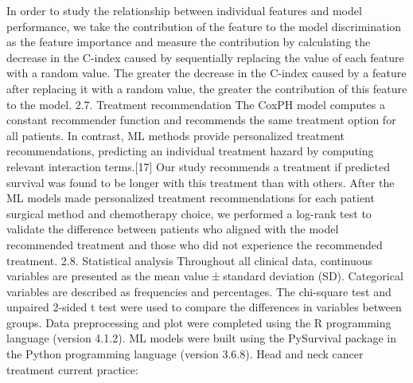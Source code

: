 \documentclass{article}%
\begin{document}
\newline%
\newline%
%
In order to study the relationship between individual features and model performance, we take the contribution of the feature to the model discrimination as the feature importance and measure the contribution by calculating the decrease in the C{-}index caused by sequentially replacing the value of each feature with a random value. The greater the decrease in the C{-}index caused by a feature after replacing it with a random value, the greater the contribution of this feature to the model.%
\newline%
\newline%
%
%
\newline%
\newline%
%
2.7. Treatment recommendation%
\newline%
\newline%
%
The CoxPH model computes a constant recommender function and recommends the same treatment option for all patients. In contrast, ML methods provide personalized treatment recommendations, predicting an individual treatment hazard by computing relevant interaction terms.{[}17{]} Our study recommends a treatment if predicted survival was found to be longer with this treatment than with others. After the ML models made personalized treatment recommendations for each patient surgical method and chemotherapy choice, we performed a log{-}rank test to validate the difference between patients who aligned with the model recommended treatment and those who did not experience the recommended treatment.%
\newline%
\newline%
%
%
\newline%
\newline%
%
2.8. Statistical analysis%
\newline%
\newline%
%
Throughout all clinical data, continuous variables are presented as the mean value ± standard deviation (SD). Categorical variables are described as frequencies and percentages. The chi{-}square test and unpaired 2{-}sided t test were used to compare the differences in variables between groups. Data preprocessing and plot were completed using the R programming language (version 4.1.2). ML models were built using the PySurvival package in the Python programming language (version 3.6.8).%
\newline%
\newline%
%
Head and neck cancer treatment current practice:%
\end{document}

